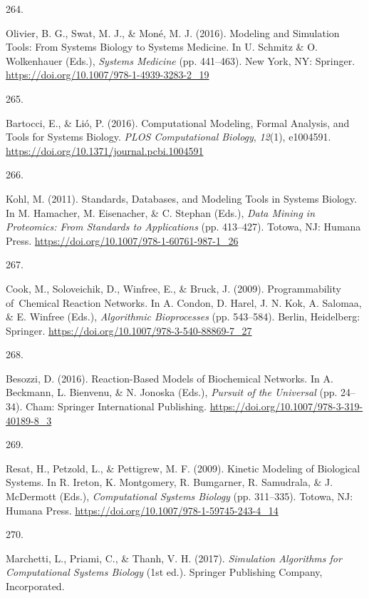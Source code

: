 \documentclass[
  11pt,
  letterpaper,
]{scrreprt}
\newlength{\cslhangindent}
\newlength{\csllabelwidth}
\newenvironment{CSLReferences}[2] %
 {\begin{list}{}{%
  \setlength{\itemindent}{0pt}
  \setlength{\leftmargin}{0pt}
  \setlength{\parsep}{0pt}
  \ifodd #1
   \setlength{\leftmargin}{\cslhangindent}
   \setlength{\itemindent}{-1\cslhangindent}
  \fi
  \setlength{\itemsep}{#2\baselineskip}}}
 {\end{list}}
\newcommand{\CSLLeftMargin}[1]{\parbox[t]{\csllabelwidth}{\strut#1\strut}}
\newcommand{\CSLRightInline}[1]{\parbox[t]{\linewidth - \csllabelwidth}{\strut#1\strut}}
\begin{document}
\begin{CSLReferences}{0}{0}
\CSLLeftMargin{264. }%
\CSLRightInline{Olivier, B. G., Swat, M. J., \& Moné, M. J. (2016).
Modeling and {Simulation Tools}: {From Systems Biology} to {Systems
Medicine}. In U. Schmitz \& O. Wolkenhauer (Eds.), \emph{Systems
{Medicine}} (pp. 441--463). New York, NY: Springer.
\url{https://doi.org/10.1007/978-1-4939-3283-2_19}}

\CSLLeftMargin{265. }%
\CSLRightInline{Bartocci, E., \& Lió, P. (2016). Computational
{Modeling}, {Formal Analysis}, and {Tools} for {Systems Biology}.
\emph{PLOS Computational Biology}, \emph{12}(1), e1004591.
\url{https://doi.org/10.1371/journal.pcbi.1004591}}

\CSLLeftMargin{266. }%
\CSLRightInline{Kohl, M. (2011). Standards, {Databases}, and {Modeling
Tools} in {Systems Biology}. In M. Hamacher, M. Eisenacher, \& C.
Stephan (Eds.), \emph{Data {Mining} in {Proteomics}: {From Standards} to
{Applications}} (pp. 413--427). Totowa, NJ: Humana Press.
\url{https://doi.org/10.1007/978-1-60761-987-1_26}}

\CSLLeftMargin{267. }%
\CSLRightInline{Cook, M., Soloveichik, D., Winfree, E., \& Bruck, J.
(2009). Programmability of~{Chemical Reaction Networks}. In A. Condon,
D. Harel, J. N. Kok, A. Salomaa, \& E. Winfree (Eds.), \emph{Algorithmic
{Bioprocesses}} (pp. 543--584). Berlin, Heidelberg: Springer.
\url{https://doi.org/10.1007/978-3-540-88869-7_27}}

\CSLLeftMargin{268. }%
\CSLRightInline{Besozzi, D. (2016). Reaction-{Based Models} of
{Biochemical Networks}. In A. Beckmann, L. Bienvenu, \& N. Jonoska
(Eds.), \emph{Pursuit of the {Universal}} (pp. 24--34). Cham: Springer
International Publishing.
\url{https://doi.org/10.1007/978-3-319-40189-8_3}}

\CSLLeftMargin{269. }%
\CSLRightInline{Resat, H., Petzold, L., \& Pettigrew, M. F. (2009).
Kinetic {Modeling} of {Biological Systems}. In R. Ireton, K. Montgomery,
R. Bumgarner, R. Samudrala, \& J. McDermott (Eds.), \emph{Computational
{Systems Biology}} (pp. 311--335). Totowa, NJ: Humana Press.
\url{https://doi.org/10.1007/978-1-59745-243-4_14}}

\CSLLeftMargin{270. }%
\CSLRightInline{Marchetti, L., Priami, C., \& Thanh, V. H. (2017).
\emph{Simulation {Algorithms} for {Computational Systems Biology}} (1st
ed.). Springer Publishing Company, Incorporated.}


\end{CSLReferences}
\end{document}
